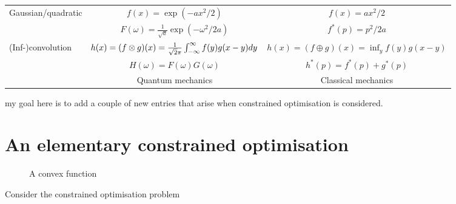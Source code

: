 \documentclass[10pt]{article}
\begin{document}
\begin{tabular}{| l | c | c |}
\hline

Gaussian/quadratic & $f(x) = \exp(-ax^2/2)$ & $f(x) = ax^2/2$ \\
& $F(\omega) = \frac{1}{\sqrt{a}}\exp(-\omega^2/2a)$ & $f^\ast(p) = p^2/2a$ \\

\hline

(Inf-)convolution & $h(x) = (f\otimes g)(x) = \frac{1}{\sqrt2\pi}\int_{-\infty}^{\infty} f(y)g(x-y)dy$ & $h(x) = (f\oplus g)(x) = \inf_y f(y)g(x-y)$ \\
& $H(\omega) = F(\omega)G(\omega)$ & $h^\ast(p) = f^\ast(p)+g^\ast(p)$ \\

\hline

& Quantum mechanics & Classical mechanics \\

\hline

\end{tabular}

my goal here is to add a couple of new entries that arise when constrained optimisation is considered.

\section{An elementary constrained optimisation}
\label{sec:opt}

\begin{figure}
\centering
{}
\caption{A convex function}
\label{convex}
\end{figure}
Consider the constrained optimisation problem
\end{document}
